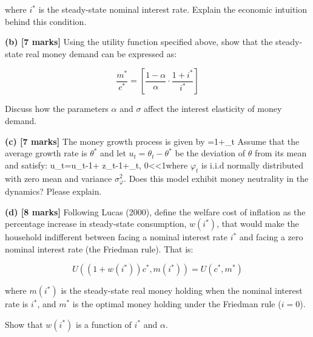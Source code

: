where $i^*$ is the steady-state nominal interest rate. Explain the economic intuition behind this condition.





\vspace{0.3cm}

\vspace{0.3cm}
\noindent\textbf{(b) [7 marks]} Using the utility function specified above, show that the steady-state real money demand can be expressed as:

\begin{equation}
\frac{m^*}{c^*} = \left[\frac{1-\alpha}{\alpha} \cdot \frac{1+i^*}{i^*}\right]
\end{equation}

Discuss how the parameters $\alpha$ and $\sigma$ affect the interest elasticity of money demand.


\noindent\textbf{(c) [7 marks]} The money growth process is given by
\be {}=1+\theta_t \ee
 Assume that the average growth
rate is $\theta^*$ and let $u_t=\theta_t-\theta^*$ be the deviation
of $\theta$ from its mean and satisfy: \be u_t=\gamma u_{t-1}+\phi
z_{t-1}+\varphi_t, \hspace{1cm} 0<\gamma<1\ee \noi where $\varphi_t$
is i.i.d normally distributed with zero mean and variance
$\sigma_{\varphi}^2$.  Does this model exhibit money neutrality in the dynamics? Please explain. 




\vspace{0.3cm}

\noindent\textbf{(d) [8 marks]} Following Lucas (2000), define the welfare cost of inflation as the percentage increase in steady-state consumption, $w(i^*)$, that would make the household indifferent between facing a nominal interest rate $i^*$ and facing a zero nominal interest rate (the Friedman rule). That is:

\begin{equation}
U\left((1+w(i^*))c^*, m(i^*)\right) = U(c^*, m^*)
\end{equation}

where $m(i^*)$ is the steady-state real money holding when the nominal interest rate is $i^*$, and $m^*$ is the optimal money holding under the Friedman rule ($i=0$).

Show that $w(i^*)$ is a function of $i^*$ and $\alpha$.



